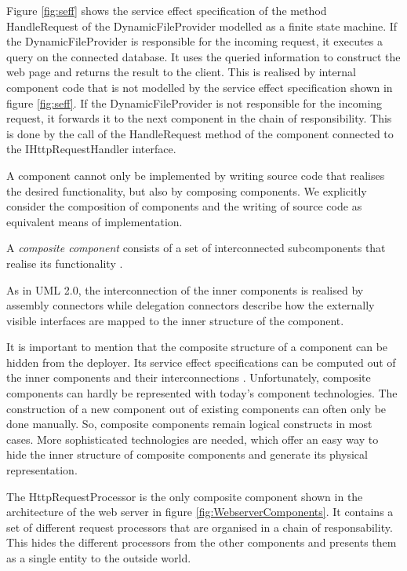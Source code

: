 Figure \ref{fig:seff} shows the service effect specification of the method
HandleRequest of the DynamicFileProvider modelled as a
finite state machine. If the DynamicFileProvider is responsible for the incoming
request, it executes a query on the connected database. It uses the queried
information to construct the web page and returns the result to the client.
This is realised by internal component code that is not modelled by the
service effect specification shown in figure \ref{fig:seff}. If the
DynamicFileProvider is not responsible for the incoming
request, it forwards it to the next component in the chain of
responsibility. This is done by the call of the HandleRequest method of the
component connected to the IHttpRequestHandler interface.

A component cannot only be implemented by writing source code that realises the
desired functionality, but also by composing components. We explicitly consider
the composition of components and the writing of source code as equivalent
means of implementation.

A \emph{composite component} consists of a set of interconnected subcomponents
that realise its functionality \cite[TODO:page]{OMGUML2005a}. 

As in UML 2.0, the interconnection of the inner components is realised by
assembly connectors while delegation connectors describe how the externally
visible interfaces are mapped to the inner structure of the component.

It is important to mention that the composite structure of a component can be
hidden from the deployer. Its service effect specifications can be computed out
of the inner components and their interconnections \cite{TODO:Reference FESCA
paper}. Unfortunately, composite components can hardly be represented with
today's component technologies. The construction of a new component out of
existing components can often only be done manually. So, composite
components remain logical constructs in most cases. More sophisticated
technologies are needed, which offer an easy way to hide the inner structure of
composite components and generate its physical representation.

The HttpRequestProcessor is the only composite component shown in the
architecture of the web server in figure \ref{fig:WebserverComponents}. It
contains a set of different request processors that are organised in
a  chain of responsability. This hides the different processors from the other
components and presents them as a single entity to the outside world.

